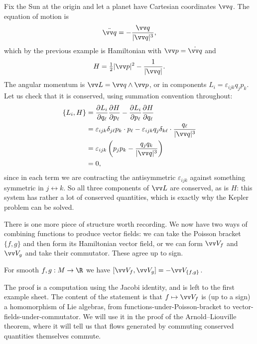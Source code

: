 \begin{example}
	Fix the Sun at the origin and let a planet have Cartesian coordinates $\vv q$. The equation of motion is
	$$
	\ddot{\vv q} = -\frac{\vv q}{|\vv q|^3},
	$$
	which by the previous example is Hamiltonian with $\vv p = \dot{\vv q}$ and
	$$
	H = \tfrac{1}{2}|\vv p|^2 - \frac{1}{|\vv q|}.
	$$
	The angular momentum is $\vv L = \vv q \wedge \vv p$, or in components $L_i = \varepsilon_{ijk}q_j p_k$. Let us check that it is conserved, using summation convention throughout:
	\begin{align*}
		\{L_i, H\} &= \frac{\partial L_i}{\partial q_\ell}\frac{\partial H}{\partial p_\ell} - \frac{\partial L_i}{\partial p_\ell}\frac{\partial H}{\partial q_\ell}\\
		&= \varepsilon_{ijk}\delta_{j\ell}p_k \cdot p_\ell - \varepsilon_{ijk}q_j\delta_{k\ell}\cdot \frac{q_\ell}{|\vv q|^3}\\
		&= \varepsilon_{ijk}\left(p_j p_k - \frac{q_j q_k}{|\vv q|^3}\right)\\
		&= 0,
	\end{align*}
	since in each term we are contracting the antisymmetric $\varepsilon_{ijk}$ against something symmetric in $j \leftrightarrow k$. So all three components of $\vv L$ are conserved, as is $H$: this system has rather a lot of conserved quantities, which is exactly why the Kepler problem can be solved.
\end{example}

There is one more piece of structure worth recording. We now have two ways of combining functions to produce vector fields: we can take the Poisson bracket $\{f,g\}$ and then form its Hamiltonian vector field, or we can form $\vv V_f$ and $\vv V_g$ and take their commutator. These agree up to sign.

\begin{proposition}
	For smooth $f,g : M \to \R$ we have $[\vv V_f, \vv V_g] = -\vv V_{\{f,g\}}$.
\end{proposition}

The proof is a computation using the Jacobi identity, and is left to the first example sheet. The content of the statement is that $f \mapsto \vv V_f$ is (up to a sign) a homomorphism of Lie algebras, from functions-under-Poisson-bracket to vector-fields-under-commutator. We will use it in the proof of the Arnold--Liouville theorem, where it will tell us that flows generated by commuting conserved quantities themselves commute.

